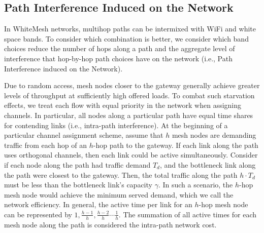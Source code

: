 \subsection{Path Interference Induced on the Network}
\label{subsec:PEN}

In WhiteMesh networks, multihop paths can be intermixed with WiFi and 
white space bands.  To consider which combination is better, we consider
which band choices reduce the number of hops along a path and the 
aggregate level of interference that hop-by-hop path choices have
on the network (i.e., Path Interference induced on the Network).


Due to random access, mesh nodes closer to the gateway generally achieve
greater levels of throughput at sufficiently high offered loads. To combat such
starvation effects, we treat each flow with equal priority in the network when
assigning channels. In particular, all nodes along a particular path have equal 
time shares for contending links (i.e., intra-path interference). At the beginning of 
a particular channel assignment scheme, assume that $h$ mesh nodes are demanding
traffic from each hop of an $h$-hop path to the gateway. If each link along the 
path uses orthogonal channels, then each link could be active simultaneously. 
Consider if each node along the path had traffic demand $T_d$, and the bottleneck 
link along the path were closest to the gateway. Then, the total traffic along 
the path $h \cdot T_d$ must be less than the bottleneck link's capacity $\gamma$. 
In such a scenario, the $h$-hop mesh node would achieve the minimum served demand,
which we call the network efficiency. In general, the active time per link for an
$h$-hop mesh node can be represented by $1,\frac{h-1}{h},\frac{h-2}{h}\cdots \frac{1}{h}$.
The summation of all active times for each mesh node along the path is considered the
intra-path network cost.

